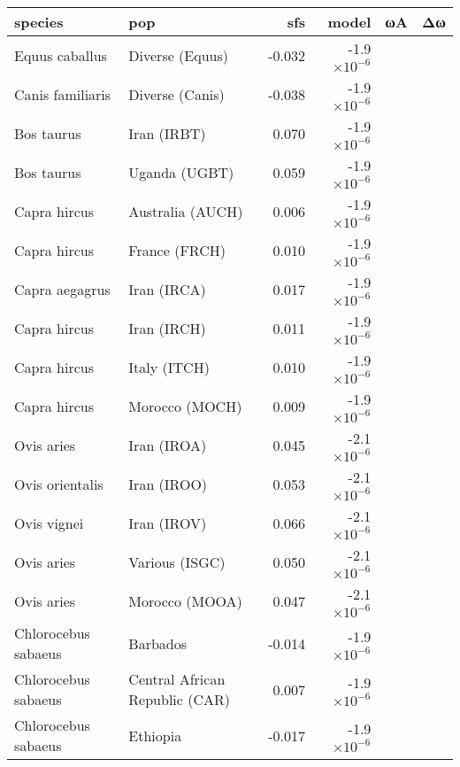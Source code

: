\begin{tabular}{|l|l|r|r|r|r|}
\toprule
             species &                             pop &       sfs & model &       ωA &                   Δω \\
\midrule
      Equus caballus &                 Diverse (Equus)  &   -0.032 & -1.9$\times 10^{-6}$ \\
    Canis familiaris &                 Diverse (Canis)  &   -0.038 & -1.9$\times 10^{-6}$ \\
          Bos taurus &                     Iran (IRBT)  &    0.070 & -1.9$\times 10^{-6}$ \\
          Bos taurus &                   Uganda (UGBT)  &    0.059 & -1.9$\times 10^{-6}$ \\
        Capra hircus &                Australia (AUCH)  &    0.006 & -1.9$\times 10^{-6}$ \\
        Capra hircus &                   France (FRCH)  &    0.010 & -1.9$\times 10^{-6}$ \\
      Capra aegagrus &                     Iran (IRCA)  &    0.017 & -1.9$\times 10^{-6}$ \\
        Capra hircus &                     Iran (IRCH)  &    0.011 & -1.9$\times 10^{-6}$ \\
        Capra hircus &                    Italy (ITCH)  &    0.010 & -1.9$\times 10^{-6}$ \\
        Capra hircus &                  Morocco (MOCH)  &    0.009 & -1.9$\times 10^{-6}$ \\
          Ovis aries &                     Iran (IROA)  &    0.045 & -2.1$\times 10^{-6}$ \\
     Ovis orientalis &                     Iran (IROO)  &    0.053 & -2.1$\times 10^{-6}$ \\
         Ovis vignei &                     Iran (IROV)  &    0.066 & -2.1$\times 10^{-6}$ \\
          Ovis aries &                  Various (ISGC)  &    0.050 & -2.1$\times 10^{-6}$ \\
          Ovis aries &                  Morocco (MOOA)  &    0.047 & -2.1$\times 10^{-6}$ \\
 Chlorocebus sabaeus &                        Barbados  &   -0.014 & -1.9$\times 10^{-6}$ \\
 Chlorocebus sabaeus &  Central African Republic (CAR)  &    0.007 & -1.9$\times 10^{-6}$ \\
 Chlorocebus sabaeus &                        Ethiopia  &   -0.017 & -1.9$\times 10^{-6}$ \\

\end{tabular}
